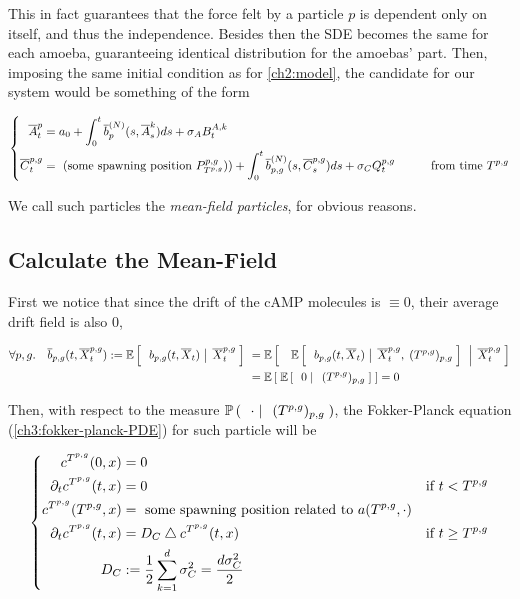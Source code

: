 This in fact guarantees that the force felt by a particle $p$ is dependent only on itself, and thus the independence. Besides then the SDE becomes the same for each amoeba, guaranteeing identical distribution for the amoebas' part.
Then, imposing the same initial condition as for \ref{ch2:model}, the candidate for our system would be something of the form

\begin{equation}\label{eq:approximate-mean-field-equations}
	\left\{
	\begin{aligned}
		\overline{A}^p_t &= a_0 + \int_0^t \overline{b}^{(N)}_p(s,\overline{A}_s^k) d s + \sigma_A B_t^{A,k} &
		\\
		\overline{C}^{p,g}_t &= \text{ (some spawning position } P_{T^{p,g}}^{p,g})) + \int_0^t \overline{b}^{(N)}_{p,g}(s,\overline{C}_s^{p,g}) d s + \sigma_C Q_t^{p,g}\qquad &\text{from time }T^{p,g}
	\end{aligned}
	\right.
\end{equation}

We call such particles the \emph{mean-field particles}, for obvious reasons.

\subsection{Calculate the Mean-Field}

First we notice that since the drift of the cAMP molecules is $\equiv 0$, their average drift field is also 0, \ie

\begin{align*}
\forall p,g. \quad \overline{b}_{p,g}(t, \overline{X}_t^{p,g}) 
:= \mathbb{E} \left[ \; \left. \; b_{p,g}(t, \overline{X}_t)  \; \right| \; \overline{X}_t^{p,g} \; \right]\
&=\mathbb{E} \left[ \; \left. \; \ \mathbb{E} \left[ \; \left. \;  b_{p,g}(t, \overline{X}_t)  \; \right| \; \overline{X}_t^{p,g}, \;(T^{p,g})_{p,g} \; \right]\  \; \right| \; \overline{X}_t^{p,g} \; \right]
\\
&= \mathbb{E} \left[ \; \mathbb{E} \left[ \; \left. \;  0  \; \right| \; \;(T^{p,g})_{p,g} \; \right]  \; \right]  = 0
\end{align*}

Then, with respect to the measure $\mathbb{P} \left( \; \left. \; \cdot \; \right| \; \;(T^{p,g})_{p,g}  \; \right)$, the Fokker-Planck equation (\ref{ch3:fokker-planck-PDE}) for such particle will be

\begin{equation}
\left\{
\begin{aligned}
c^{T^{p,g}}(0, x) 
&= 0 
&&
\\
\partial_t c^{T^{p,g}}(t, x) 
&= 0 
&&\text{if } t < T^{p,g}
\\
c^{T^{p,g}}(T^{p,g}, x) 
&= \text{ some spawning position related to } a(T^{p,g}, \cdot)
&&
\\
\partial_t c^{T^{p,g}}(t, x) 
&= D_C \bigtriangleup c^{T^{p,g}}(t, x) 
&&\text{if } t \geq T^{p,g}
\\
D_C
&:= \frac{1}{2} \sum_{k=1}^{d} \sigma_C^2 = \frac{d\sigma_C^2}{2}
&&
\end{aligned}
\right.
\end{equation}

